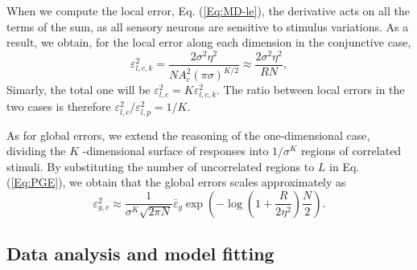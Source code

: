 \documentclass[a4paper]{article}%
\begin{document}
When we compute the local error, Eq. (\ref{Eq:MD-le}), the derivative acts on
all the terms of the sum, as all sensory neurons are sensitive to stimulus
variations. As a result, we obtain, for the local error along each dimension
in the conjunctive case,
\begin{equation}
\varepsilon_{l,c,k}^{2} = \frac{2 \sigma^{2} \eta^{2}}{ NA_{c}^{2} (\pi
\sigma)^{K/2}} \approx\frac{2\sigma^{2} \eta^{2}}{RN},
\label{Eq:multi-local-conj}%
\end{equation}
Simarly, the total one will be $\varepsilon^{2}_{l,c} = K\varepsilon
_{l,c,k}^{2}$. The ratio between local errors in the two cases is therefore
$\varepsilon_{l,c}^{2} /\varepsilon^{2}_{l,p} = 1/K$.

As for global errors, we extend the
reasoning of the one-dimensional case, dividing the $K$
-dimensional surface of responses into $1/\sigma^{K}$ regions of correlated stimuli. By substituting the number of uncorrelated regions to $L$ in Eq.
(\ref{Eq:PGE}), we obtain that the global errors scales approximately as
\begin{equation}
\varepsilon_{g,c}^{2} \approx\frac{1}{\sigma^{K}\sqrt{2\pi N}}\bar
{\varepsilon}_{g} \exp{\left(  -\log\left(  1 + \frac{R}{2\eta^{2}}\right)
\frac{N}{2} \right)  }. \label{Eq:multi-global-conj}%
\end{equation}


\subsection*{Data analysis and model fitting}
\end{document}
